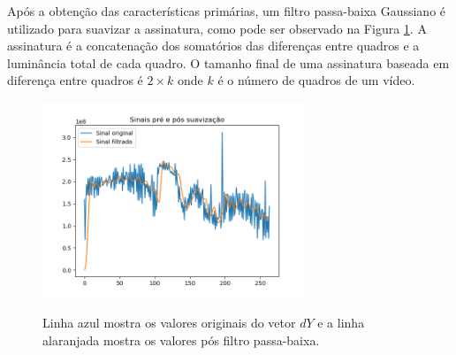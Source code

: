    Após a obtenção das características primárias, um filtro passa-baixa Gaussiano é utilizado para suavizar a assinatura, como pode ser observado na Figura \ref{fig:framediff-passa-baixa}. A assinatura é a concatenação dos somatórios das diferenças entre quadros e a luminância total de cada quadro. O tamanho final de uma assinatura baseada em diferença entre quadros é $2 \times k$ onde $k$ é o número de quadros de um vídeo.




\begin{figure}[h]
\centering
	\caption{Linha azul mostra os valores originais do vetor $dY$ e a linha alaranjada mostra os valores pós filtro passa-baixa.}
  	\includegraphics[width=0.7\textwidth]{dados/figuras/filtro_passa_baixa}
  \label{fig:framediff-passa-baixa}
\end{figure}


